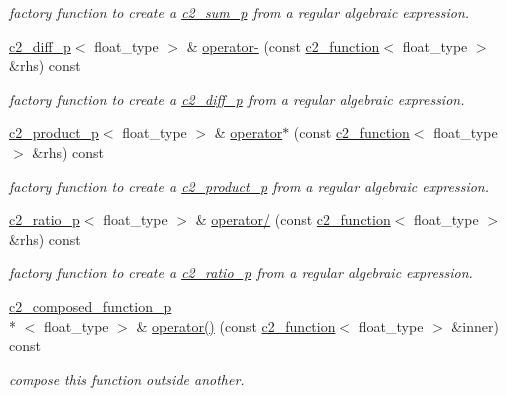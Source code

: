 \begin{DoxyCompactItemize}
\begin{DoxyCompactList}\small\item\em factory function to create a \hyperlink{classc2__sum__p}{c2\-\_\-sum\-\_\-p} from a regular algebraic expression. \end{DoxyCompactList}\item 
\hyperlink{classc2__diff__p}{c2\-\_\-diff\-\_\-p}$<$ float\-\_\-type $>$ \& \hyperlink{classc2__function_a4c56a4673e00bfad37143c403a0c94c8}{operator-\/} (const \hyperlink{classc2__function}{c2\-\_\-function}$<$ float\-\_\-type $>$ \&rhs) const 
\begin{DoxyCompactList}\small\item\em factory function to create a \hyperlink{classc2__diff__p}{c2\-\_\-diff\-\_\-p} from a regular algebraic expression. \end{DoxyCompactList}\item 
\hyperlink{classc2__product__p}{c2\-\_\-product\-\_\-p}$<$ float\-\_\-type $>$ \& \hyperlink{classc2__function_a7744675c98a8ec63320ac1c0b61bec9c}{operator$\ast$} (const \hyperlink{classc2__function}{c2\-\_\-function}$<$ float\-\_\-type $>$ \&rhs) const 
\begin{DoxyCompactList}\small\item\em factory function to create a \hyperlink{classc2__product__p}{c2\-\_\-product\-\_\-p} from a regular algebraic expression. \end{DoxyCompactList}\item 
\hyperlink{classc2__ratio__p}{c2\-\_\-ratio\-\_\-p}$<$ float\-\_\-type $>$ \& \hyperlink{classc2__function_a93ac28dfe5daebea84d147b8e346e60c}{operator/} (const \hyperlink{classc2__function}{c2\-\_\-function}$<$ float\-\_\-type $>$ \&rhs) const 
\begin{DoxyCompactList}\small\item\em factory function to create a \hyperlink{classc2__ratio__p}{c2\-\_\-ratio\-\_\-p} from a regular algebraic expression. \end{DoxyCompactList}\item 
\hyperlink{classc2__composed__function__p}{c2\-\_\-composed\-\_\-function\-\_\-p}\\*
$<$ float\-\_\-type $>$ \& \hyperlink{classc2__function_a9332f7b389579a9b03eb57578649e07f}{operator()} (const \hyperlink{classc2__function}{c2\-\_\-function}$<$ float\-\_\-type $>$ \&inner) const 
\begin{DoxyCompactList}\small\item\em compose this function outside another. \end{DoxyCompactList}\item 

\end{DoxyCompactItemize}
